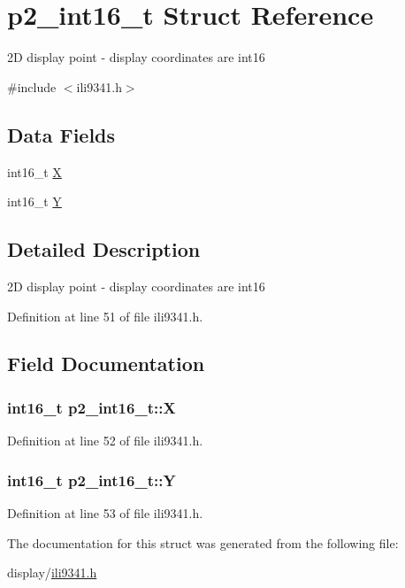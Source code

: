 \hypertarget{structp2__int16__t}{}\section{p2\+\_\+int16\+\_\+t Struct Reference}
\label{structp2__int16__t}


2D display point -\/ display coordinates are int16  




{\ttfamily \#include $<$ili9341.\+h$>$}

\subsection*{Data Fields}
\begin{DoxyCompactItemize}
\item 
int16\+\_\+t \hyperlink{structp2__int16__t_a017972fd9b6519624f8ebc119a11ced9}{X}
\item 
int16\+\_\+t \hyperlink{structp2__int16__t_a13502352cac20adbf543b35dc25bf76c}{Y}
\end{DoxyCompactItemize}


\subsection{Detailed Description}
2D display point -\/ display coordinates are int16 

Definition at line 51 of file ili9341.\+h.



\subsection{Field Documentation}
\subsubsection[{\texorpdfstring{X}{X}}]{\setlength{\rightskip}{0pt plus 5cm}int16\+\_\+t p2\+\_\+int16\+\_\+t\+::X}\hypertarget{structp2__int16__t_a017972fd9b6519624f8ebc119a11ced9}{}\label{structp2__int16__t_a017972fd9b6519624f8ebc119a11ced9}


Definition at line 52 of file ili9341.\+h.

\subsubsection[{\texorpdfstring{Y}{Y}}]{\setlength{\rightskip}{0pt plus 5cm}int16\+\_\+t p2\+\_\+int16\+\_\+t\+::Y}\hypertarget{structp2__int16__t_a13502352cac20adbf543b35dc25bf76c}{}\label{structp2__int16__t_a13502352cac20adbf543b35dc25bf76c}


Definition at line 53 of file ili9341.\+h.



The documentation for this struct was generated from the following file\+:\begin{DoxyCompactItemize}
\item 
display/\hyperlink{ili9341_8h}{ili9341.\+h}\end{DoxyCompactItemize}
